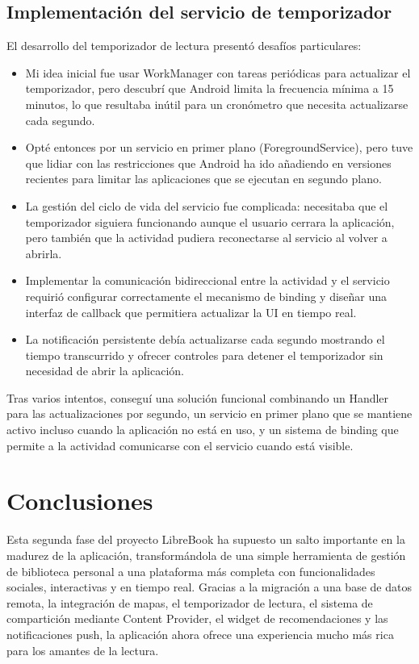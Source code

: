 \documentclass[a4paper,11pt]{report}
\begin{document}
    \section{Implementación del servicio de temporizador}
      El desarrollo del temporizador de lectura presentó desafíos particulares:
      \begin{itemize}
        \item Mi idea inicial fue usar WorkManager con tareas periódicas para actualizar el temporizador, pero descubrí que Android limita la frecuencia mínima a 15 minutos, lo que resultaba inútil para un cronómetro que necesita actualizarse cada segundo.
        \item Opté entonces por un servicio en primer plano (ForegroundService), pero tuve que lidiar con las restricciones que Android ha ido añadiendo en versiones recientes para limitar las aplicaciones que se ejecutan en segundo plano.
        \item La gestión del ciclo de vida del servicio fue complicada: necesitaba que el temporizador siguiera funcionando aunque el usuario cerrara la aplicación, pero también que la actividad pudiera reconectarse al servicio al volver a abrirla.
        \item Implementar la comunicación bidireccional entre la actividad y el servicio requirió configurar correctamente el mecanismo de binding y diseñar una interfaz de callback que permitiera actualizar la UI en tiempo real.
        \item La notificación persistente debía actualizarse cada segundo mostrando el tiempo transcurrido y ofrecer controles para detener el temporizador sin necesidad de abrir la aplicación.
      \end{itemize}
      Tras varios intentos, conseguí una solución funcional combinando un Handler para las actualizaciones por segundo, un servicio en primer plano que se mantiene activo incluso cuando la aplicación no está en uso, y un sistema de binding que permite a la actividad comunicarse con el servicio cuando está visible.
      \chapter{Conclusiones}
        Esta segunda fase del proyecto LibreBook ha supuesto un salto importante en la madurez de la aplicación, transformándola de una simple herramienta de gestión de biblioteca personal a una plataforma más completa con funcionalidades sociales, interactivas y en tiempo real. Gracias a la migración a una base de datos remota, la integración de mapas, el temporizador de lectura, el sistema de compartición mediante Content Provider, el widget de recomendaciones y las notificaciones push, la aplicación ahora ofrece una experiencia mucho más rica para los amantes de la lectura.\\
        
\end{document}
